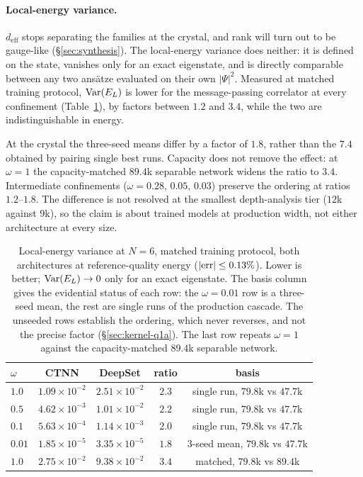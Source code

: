 \paragraph{Local-energy variance.} $d_{\mathrm{eff}}$
stops separating the families at the crystal, and rank will turn out to be gauge-like
(\S\ref{sec:synthesis}). The local-energy variance does neither: it is defined on the
state, vanishes only for an exact eigenstate, and is directly comparable between any two
ansätze evaluated on their own $|\Psi|^2$. Measured at matched training protocol,
$\mathrm{Var}(E_L)$ is lower for the message-passing correlator at every confinement
(Table~\ref{tab:varEL}), by factors between $1.2$ and $3.4$, while the two are
indistinguishable in energy.

At the crystal the three-seed means differ by a factor of $1.8$, rather than the $7.4$
obtained by pairing single best runs. Capacity does not remove the effect: at $\omega=1$ the
capacity-matched $89.4$k separable network widens the ratio to $3.4$. Intermediate
confinements ($\omega=0.28,\,0.05,\,0.03$) preserve the ordering at ratios $1.2$--$1.8$.
The difference is not resolved at the smallest depth-analysis tier ($12$k against $9$k), so
the claim is about trained models at production width, not either architecture at every size.

\begin{table}[htbp]\centering
\caption[Local-energy variance by architecture]{Local-energy variance at $N{=}6$, matched training protocol, both architectures at
reference-quality energy ($|{\rm err}|\le0.13\%$). Lower is better; $\mathrm{Var}(E_L)\to0$ only for
an exact eigenstate. The basis column gives the evidential status of each row: the $\omega=0.01$ row is a
three-seed mean, the rest are single runs of the production cascade. The unseeded rows
establish the ordering, which never reverses, and not the precise factor
(\S\ref{sec:kernel-q1a}). The last row repeats $\omega=1$ against the capacity-matched
$89.4$k separable network.}
\label{tab:varEL}
\begin{tabular}{lcccc}
\hline
$\omega$ & CTNN & DeepSet & ratio & basis \\
\hline
$1.0$  & $1.09\times10^{-2}$ & $2.51\times10^{-2}$ & $2.3$ & single run, $79.8$k vs $47.7$k \\
$0.5$  & $4.62\times10^{-3}$ & $1.01\times10^{-2}$ & $2.2$ & single run, $79.8$k vs $47.7$k \\
$0.1$  & $5.63\times10^{-4}$ & $1.14\times10^{-3}$ & $2.0$ & single run, $79.8$k vs $47.7$k \\
$0.01$ & $1.85\times10^{-5}$ & $3.35\times10^{-5}$ & $1.8$ & 3-seed mean, $79.8$k vs $47.7$k \\
\hline
$1.0$  & $2.75\times10^{-2}$ & $9.38\times10^{-2}$ & $3.4$ & matched, $79.8$k vs $89.4$k \\
\hline
\end{tabular}
\end{table}

